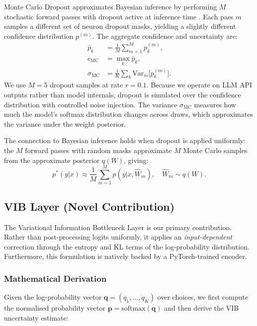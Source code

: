 \documentclass[conference]{IEEEtran}
\begin{document}
Monte Carlo Dropout approximates Bayesian inference by performing
$M$ stochastic forward passes with dropout active at inference time
\cite{gal2016dropout}. Each pass $m$ samples a different set of
neuron dropout masks, yielding a slightly different confidence
distribution $p^{(m)}$. The aggregate confidence and uncertainty are:
\begin{equation}
\begin{aligned}
\bar{p}_k &= \frac{1}{M}\sum_{m=1}^{M} p_k^{(m)}, \\
c_{\text{MC}} &= \max_k \bar{p}_k, \\
\sigma_{\text{MC}} &= \frac{1}{K}\sum_k
\text{Var}_m\bigl[p_k^{(m)}\bigr].
\end{aligned}
\label{eq:mcd}
\end{equation}
We use $M = 5$ dropout samples at rate $r = 0.1$. Because we operate
on LLM API outputs rather than model internals, dropout is simulated
over the confidence distribution with controlled noise injection. The
variance $\sigma_{\text{MC}}$ measures how much the model's softmax
distribution changes across draws, which approximates the variance
under the weight posterior.

The connection to Bayesian inference holds when dropout is applied
uniformly: the $M$ forward passes with random masks approximate $M$
Monte Carlo samples from the approximate posterior $q(W)$, giving:
\begin{equation}
    p^*(y|x) \approx \frac{1}{M}\sum_{m=1}^M p(y|x,\hat{W}_m), \quad
    \hat{W}_m \sim q(W).
\end{equation}

\subsection{VIB Layer (Novel Contribution)}

The Variational Information Bottleneck Layer is our primary
contribution. Rather than post-processing logits uniformly, it
applies an \emph{input-dependent} correction through the entropy and
KL terms of the log-probability distribution. Furthermore, this
formulation is natively backed by a PyTorch-trained encoder.

\subsubsection{Mathematical Derivation}

Given the log-probability vector
$\mathbf{q} = (q_1, \ldots, q_K)$ over choices, we first compute
the normalised probability vector $\mathbf{p}=\text{softmax}(\mathbf{q})$
and then derive the VIB uncertainty estimate:
\end{document}
